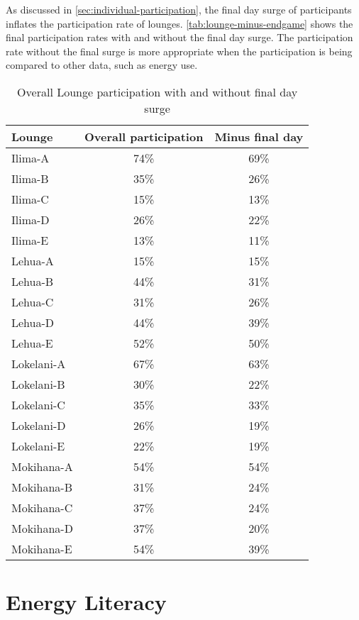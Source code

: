 As discussed in \autoref{sec:individual-participation}, the final day surge of participants inflates the participation rate of lounges. \autoref{tab:lounge-minus-endgame} shows the final participation rates with and without the final day surge. The participation rate without the final surge is more appropriate when the participation is being compared to other data, such as energy use.

\begin{table}[htbp]
	\centering
		\begin{tabular}{| l | c | c |}
			\hline
			Lounge & Overall participation & Minus final day \\ \hline
			Ilima-A & 74\% & 69\% \\ \hline
			Ilima-B & 35\% & 26\% \\ \hline
			Ilima-C & 15\% & 13\% \\ \hline
			Ilima-D & 26\% & 22\% \\ \hline
			Ilima-E & 13\% & 11\% \\ \hline
			Lehua-A & 15\% & 15\% \\ \hline
			Lehua-B & 44\% & 31\% \\ \hline
			Lehua-C & 31\% & 26\% \\ \hline
			Lehua-D & 44\% & 39\% \\ \hline
			Lehua-E & 52\% & 50\% \\ \hline
			Lokelani-A & 67\% & 63\% \\ \hline
			Lokelani-B & 30\% & 22\% \\ \hline
			Lokelani-C & 35\% & 33\% \\ \hline
			Lokelani-D & 26\% & 19\% \\ \hline
			Lokelani-E & 22\% & 19\% \\ \hline
			Mokihana-A & 54\% & 54\% \\ \hline
			Mokihana-B & 31\% & 24\% \\ \hline
			Mokihana-C & 37\% & 24\% \\ \hline
			Mokihana-D & 37\% & 20\% \\ \hline
			Mokihana-E & 54\% & 39\% \\ \hline
		\end{tabular}
	\caption{Overall Lounge participation with and without final day surge}
\label{tab:lounge-minus-endgame}
\end{table}


\section{Energy Literacy}

